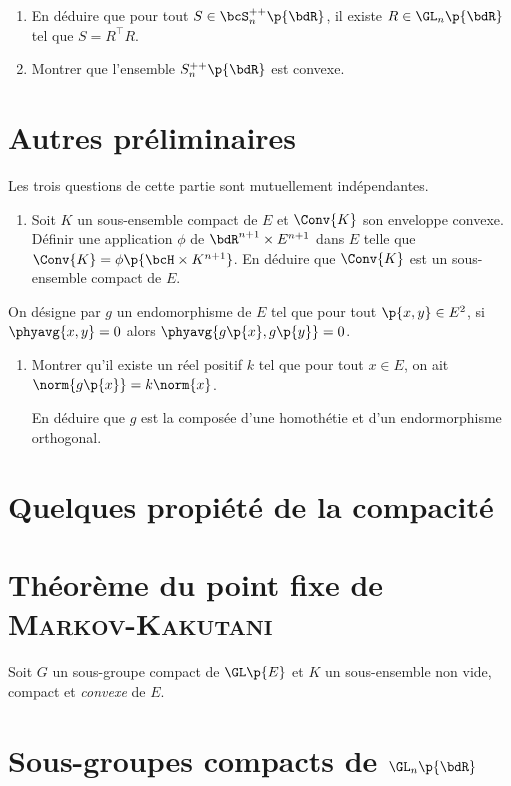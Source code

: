 \documentclass[a4paper,french,bookmarks]{article}
\begin{document}
\begin{enumerate}
        \item En déduire que pour tout $S \in \bcS_n^{++}\p{\bdR}$, il existe $R \in \GL_n\p{\bdR}$ tel que $S = R^\top R$. 
        
        \item Montrer que l'ensemble $S_n^{++}\p{\bdR}$ est convexe.
    \end{enumerate}
    
    \section{Autres préliminaires}
    
    Les trois questions de cette partie sont mutuellement indépendantes.
    
    \begin{enumerate}
        \item Soit $K$ un sous-ensemble compact de $E$ et $\Conv{K}$ son enveloppe convexe. Définir une application $\phi$ de $\bdR^{n+1} \times E^{n+1}$ dans $E$ telle que $\Conv{K} = \phi\p{\bcH \times K^{n+1}}$. En déduire que $\Conv{K}$ est un sous-ensemble compact de $E$.
    \end{enumerate}
    
    On désigne par $g$ un endomorphisme de $E$ tel que pour tout $\p{x, y} \in E^2$, si $\phyavg{x,y} = 0$ alors $\phyavg{g\p{x}, g\p{y}} = 0$.
    
    \begin{enumerate}[resume]
        \item Montrer qu'il existe un réel positif $k$ tel que pour tout $x \in E$, on ait $\norm{g\p{x}} = k\norm{x}$. 
        
        
        En déduire que $g$ est la composée d'une homothétie et d'un endormorphisme orthogonal.
    \end{enumerate}
    
    \section{Quelques propiété de la compacité}
    
    \section{Théorème du point fixe de \textsc{Markov-Kakutani}}
    
    Soit $G$ un sous-groupe compact de $\GL\p{E}$ et $K$ un sous-ensemble non vide, compact et \emph{convexe} de $E$.
    
    \section{Sous-groupes compacts de $\GL_n\p{\bdR}$}
    
\end{document}
